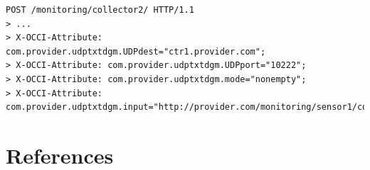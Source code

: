 \documentclass[12pt]{article}  %
\begin{document}
\begin{verbatim}
POST /monitoring/collector2/ HTTP/1.1
> ...
> X-OCCI-Attribute: com.provider.udptxtdgm.UDPdest="ctr1.provider.com";
> X-OCCI-Attribute: com.provider.udptxtdgm.UDPport="10222";
> X-OCCI-Attribute: com.provider.udptxtdgm.mode="nonempty";
> X-OCCI-Attribute: com.provider.udptxtdgm.input="http://provider.com/monitoring/sensor1/compoutput";
\end{verbatim}




\section{References}

\renewcommand{\refname}{}
\vspace*{-3em}



% 
% 
% 
% 
% 
% 
% 
\end{document}
